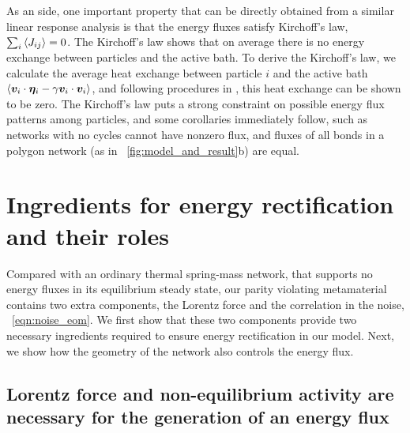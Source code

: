 \documentclass[
 preprint,
 preprintnumbers,
 amsmath,amssymb,
 aps,
 pre,
 longbibliography,
 superscriptaddress,
 10pt, twocolumn
]{revtex4-1}
\begin{document}
As an side, one important property that can be directly obtained from a similar linear response analysis is that the energy fluxes satisfy Kirchoff's law, $\sum_i \expval{J_{ij}} = 0$. The Kirchoff's law shows that on average there is no energy exchange between particles and the active bath. 
To derive the Kirchoff's law, we calculate the average heat exchange between particle $i$ and the active bath $\expval{\bm{v}_i \cdot \bm{\eta}_i - \gamma \bm{v}_i \cdot \bm{v}_i}$, and following procedures in \cite{Kundu2011LargeDeviations}, this heat exchange can be shown to be zero.
The Kirchoff's law puts a strong constraint on possible energy flux patterns among particles, and some corollaries immediately follow, such as networks with no cycles cannot have nonzero flux, and fluxes of all bonds in a polygon network (as in \figurename~\ref{fig:model_and_result}b) are equal.



\section{Ingredients for energy rectification and their roles} \label{sec:fourier}

Compared with an ordinary thermal spring-mass network, that supports no energy fluxes in its equilibrium steady state, our parity violating metamaterial contains two extra components, the Lorentz force and the correlation in the noise, \eqnname~\ref{eqn:noise_eom}.
We first show that these two components provide two necessary ingredients required to ensure energy rectification in our model. Next, we show how the geometry of the network also controls the energy flux. 



\subsection{Lorentz force and non-equilibrium activity are necessary for the generation of an energy flux} 
\end{document}
